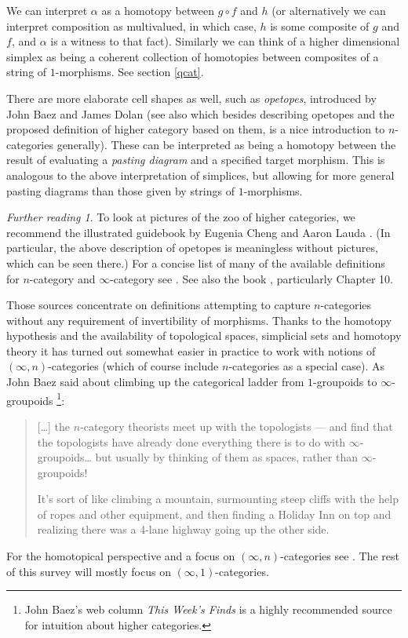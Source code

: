\documentclass[12pt]{amsart}
\theoremstyle{definition} \newtheorem{definition}[theorem]{Definition}
\theoremstyle{remark} \newtheorem{remark}[theorem]{Remark}
\newtheorem*{further}{Further reading}
\numberwithin{equation}{section}
\newcommand{\oo}{\infty}
\newcommand{\io}{$(\oo,1)$}
\begin{document}
We can interpret $\alpha$ as a homotopy between $g\circ f$ and $h$ (or
alternatively we can interpret composition as multivalued, in which
case, $h$ is some composite of $g$ and $f$, and $\alpha$ is a witness
to that fact). Similarly we can think of a higher dimensional simplex
as being a coherent collection of homotopies between composites
of a string of $1$-morphisms. See section \ref{qcat}.

There are more elaborate cell shapes as well, such as \emph{opetopes},
introduced by John Baez and James Dolan \cite{BaezDolan3} (see also
\cite{BaezIntro} which besides describing opetopes and the proposed
definition of higher category based on them, is a nice introduction to
$n$-categories generally). These can be interpreted as being a
homotopy between the result of evaluating a \emph{pasting diagram} and
a specified target morphism. This is analogous to the above
interpretation of simplices, but allowing for more general pasting
diagrams than those given by strings of $1$-morphisms.

\begin{further}
  To look at pictures of the zoo of higher categories, we recommend
  the illustrated guidebook by Eugenia Cheng and Aaron Lauda
  \cite{ChengLauda}. (In particular, the above description of opetopes
  is meaningless without pictures, which can be seen there.)  For a
  concise list of many of the available definitions for $n$-category
  and $\oo$-category see \cite{LeinsterDef}. See also the book
  \cite{LeinsterBook}, particularly Chapter 10.

  Those sources concentrate on definitions attempting to capture
  $n$-categories without any requirement of invertibility of morphisms.
  Thanks to the homotopy hypothesis and the availability of topological
  spaces, simplicial sets and homotopy theory it has turned out somewhat
  easier in practice to work with notions of $(\oo,n)$-categories
  (which of course include $n$-categories as a special case). As John
  Baez said about climbing up the categorical ladder from $1$-groupoids
  to $\oo$-groupoids \cite{TWF223}\footnote{John Baez's web column
  \emph{This Week's Finds} is a highly recommended source for intuition
  about higher categories.}:

  \begin{quotation}
    [\dots] the $n$-category theorists meet up with the topologists ---
    and find that the topologists have already done everything there is
    to do with $\oo$-groupoids\dots{} but usually by thinking of them
    as spaces, rather than $\oo$-groupoids!

    It's sort of like climbing a mountain, surmounting steep cliffs with
    the help of ropes and other equipment, and then finding a Holiday
    Inn on top and realizing there was a 4-lane highway going up the
    other side.
  \end{quotation}

  For the homotopical perspective and a focus on $(\oo,n)$-categories
  see \cite{Simpson}. The rest of this survey will mostly focus on
  \io-categories.
\end{further}
\end{document}
